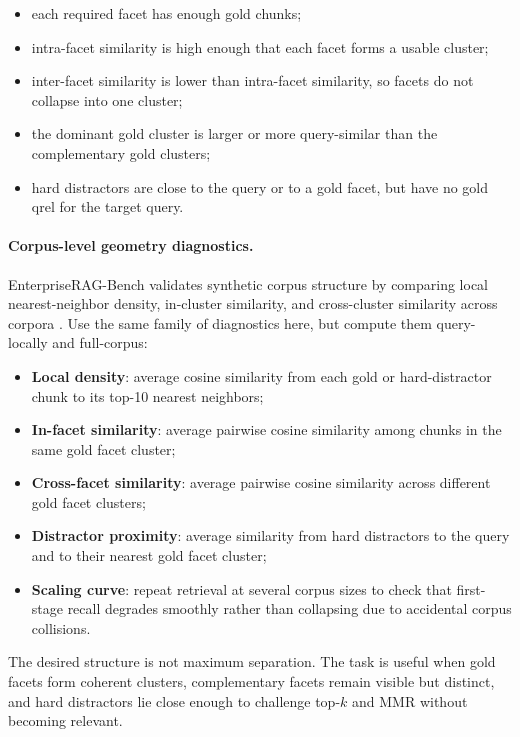 \documentclass[11pt,a4paper]{article}
\begin{document}
\begin{itemize}[leftmargin=*]
	\item each required facet has enough gold chunks;
	\item intra-facet similarity is high enough that each facet forms a usable cluster;
	\item inter-facet similarity is lower than intra-facet similarity, so facets do not collapse into one cluster;
	\item the dominant gold cluster is larger or more query-similar than the complementary gold clusters;
	\item hard distractors are close to the query or to a gold facet, but have no gold qrel for the target query.
\end{itemize}

\paragraph{Corpus-level geometry diagnostics.}
EnterpriseRAG-Bench validates synthetic corpus structure by comparing local nearest-neighbor density, in-cluster similarity, and cross-cluster similarity across corpora \citep{sun2026enterpriseragbench}. Use the same family of diagnostics here, but compute them query-locally and full-corpus:

\begin{itemize}[leftmargin=*]
	\item \textbf{Local density}: average cosine similarity from each gold or hard-distractor chunk to its top-10 nearest neighbors;
	\item \textbf{In-facet similarity}: average pairwise cosine similarity among chunks in the same gold facet cluster;
	\item \textbf{Cross-facet similarity}: average pairwise cosine similarity across different gold facet clusters;
	\item \textbf{Distractor proximity}: average similarity from hard distractors to the query and to their nearest gold facet cluster;
	\item \textbf{Scaling curve}: repeat retrieval at several corpus sizes to check that first-stage recall degrades smoothly rather than collapsing due to accidental corpus collisions.
\end{itemize}

The desired structure is not maximum separation. The task is useful when gold facets form coherent clusters, complementary facets remain visible but distinct, and hard distractors lie close enough to challenge top-$k$ and MMR without becoming relevant.
\end{document}
